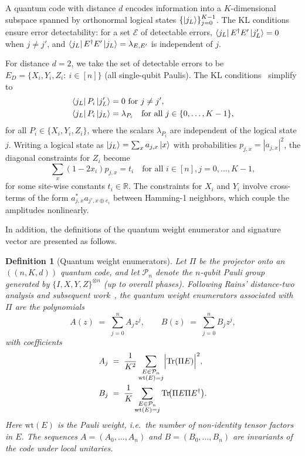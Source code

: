 \documentclass[pdflatex,sn-nature]{sn-jnl}%
\theoremstyle{thmstyleone}%
\theoremstyle{thmstyletwo}%
\theoremstyle{thmstylethree}%
\newtheorem{definition}{Definition}%
\begin{document}
\begin{appendices}
A quantum code with distance $d$ encodes information into a $K$-dimensional subspace spanned by orthonormal logical states $\{\ket{j_L}\}_{j=0}^{K-1}$. The KL conditions~\cite{Knill1997Theory} ensure error detectability: for a set $\mathcal{E}$ of detectable errors, $\bra{j_L}E^\dagger E'\ket{j'_L}=0$ when $j\neq j'$, and $\bra{j_L}E^\dagger E'\ket{j_L}=\lambda_{E,E'}$ is independent of $j$.

For distance $d=2$, we take the set of detectable errors to be $E_D=\{X_i,Y_i,Z_i:\ i\in[n]\}$ (all single-qubit Paulis). The KL conditions~\cite{Knill1997Theory} simplify to
\begin{align}
    \bra{j_L}P_i\ket{j'_L} &=0\ \text{for } j\neq j',\notag\\
    \bra{j_L}P_i\ket{j_L}  &=\lambda_{P_{i}} \quad \text{for all } j \in \{ 0, \dots, K-1\},
    \label{eq:KL-d2}
\end{align}
for all $P_i\in\{X_i,Y_i,Z_i\}$, where the scalars $\lambda_{P_i}$ are independent of the logical state $j$. Writing a logical state as $\ket{j_L}=\sum_x a_{j,x}\ket{x}$ with probabilities $p_{j,x}=|a_{j,x}|^2$, the diagonal constraints for $Z_i$ become
\begin{equation}
    \sum_x (1-2x_i)p_{j,x} = t_i \quad \text{for all } i\in[n], j=0,\ldots,K-1,
    \label{eq:Z-KL}
\end{equation}
for some site-wise constants $t_i\in\mathbb{R}$. The constraints for $X_i$ and $Y_i$ involve cross-terms of the form $a_{j,x}^* a_{j',x\oplus e_i}$ between Hamming-1 neighbors, which couple the amplitudes nonlinearly.

In addition, the definitions of the quantum weight enumerator and signature vector are presented as follows.

\begin{definition}[Quantum weight enumerators]\label{def:weight-enumerator}
Let $\Pi$ be the projector onto an $((n,K,d))$ quantum code, and let $\mathcal P_n$ denote the $n$-qubit Pauli group
generated by $\{I,X,Y,Z\}^{\otimes n}$ (up to overall phases). 
Following Rains' distance-two analysis and subsequent work~\cite{Rains2002Quantum,Du2024Characterizing,Zhang2025Transversal}, 
the quantum weight enumerators associated with $\Pi$ are the polynomials
\[
  A(z) \;=\; \sum_{j=0}^n A_j z^j,
  \qquad
  B(z) \;=\; \sum_{j=0}^n B_j z^j,
\]
with coefficients
\begin{align*}
  A_j &\;=\; \frac{1}{K^2} 
    \sum_{\substack{E\in\mathcal P_n \\ \mathrm{wt}(E)=j}}
      \Bigl|\mathrm{Tr}(\Pi E)\Bigr|^2, \\
  B_j &\;=\; \frac{1}{K} 
    \sum_{\substack{E\in\mathcal P_n \\ \mathrm{wt}(E)=j}}
      \mathrm{Tr}\!\bigl(\Pi E \Pi E^\dagger\bigr).
\end{align*}
Here $\mathrm{wt}(E)$ is the Pauli weight, i.e.\ the number of non-identity tensor factors in $E$.
The sequences $A=(A_0,\dots,A_n)$ and $B=(B_0,\dots,B_n)$ are invariants of the code under local unitaries.
\end{definition}


\end{appendices}
\end{document}
